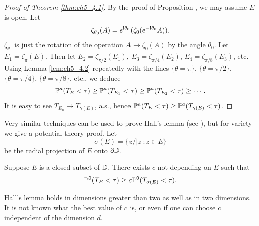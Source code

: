 
\begin{proof}[Proof of Theorem \ref{thm:ch5_4.1}]
By the proof of Proposition , we may assume $E$ is open. Let
\begin{equation}\label{eq:ch5_4.5}
    \zeta_{\theta_0}(A) = e^{\im\theta_0}(\zeta_0(e^{-\im\theta_0}A)).
\end{equation}
$\zeta_{\theta_0}$ is just the rotation of the operation $A \to \zeta_0(A)$ by the angle $\theta_0$. Let $E_1 = \zeta_\pi(E)$. Then let $E_2 = \zeta_{\pi/2}(E_1)$, $E_3 = \zeta_{\pi/4}(E_2)$, $E_4 = \zeta_{\pi/8}(E_3)$, etc. Using Lemma \ref{lem:ch5_4.2} repeatedly with the lines $\{\theta = \pi\}$, $\{\theta = \pi/2\}$, $\{\theta = \pi/4\}$, $\{\theta = \pi/8\}$, etc., we deduce
\[
    \P^a(T_E < \tau) \geq \P^a(T_{E_1} < \tau) \geq \P^a(T_{E_2} < \tau) \geq \cdots .
\]
It is easy to see $T_{E_n} \to T_{\gamma(E)}$, a.s., hence $\P^a(T_E < \tau) \geq \P^a(T_{\gamma(E)} < \tau)$.
\end{proof}


Very similar techniques can be used to prove Hall's lemma (see \cite{Oksendal1983}), but for variety we give a potential theory proof. Let
\begin{equation}\label{eq:ch5_4.6}
    \sigma(E) = \{z/|z| : z \in E\}
\end{equation}
be the radial projection of $E$ onto $\partial\D$.

\begin{theorem}\label{thm:ch5_4.3}
Suppose $E$ is a closed subset of $\D$. There exists $c$ not depending on $E$ such that
\begin{equation}\label{eq:ch5_4.7}
    \P^0(T_E < \tau) \geq c\P^0(T_{\sigma(E)} < \tau).
\end{equation}
\end{theorem}

Hall's lemma holds in dimensions greater than two as well as in two dimensions. It is not known what the best value of $c$ is, or even if one can choose $c$ independent of the dimension $d$.

